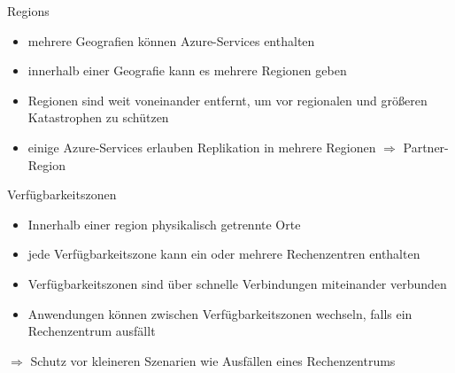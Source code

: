 

\begin{flashcard}[]{Regions}
  \begin{itemize}
    \item mehrere Geografien können Azure-Services enthalten
    \item innerhalb einer Geografie kann es mehrere Regionen geben
    \item Regionen sind weit voneinander entfernt, um vor regionalen und größeren Katastrophen zu schützen
    \item einige Azure-Services erlauben Replikation in mehrere Regionen\newline
      $\Rightarrow$ Partner-Region
  \end{itemize}
\end{flashcard}

\begin{flashcard}[]{Verfügbarkeitszonen}
  \begin{itemize}
    \item Innerhalb einer region physikalisch getrennte Orte
    \item jede Verfügbarkeitszone kann ein oder mehrere Rechenzentren enthalten
    \item Verfügbarkeitszonen sind über schnelle Verbindungen miteinander verbunden
    \item Anwendungen können zwischen Verfügbarkeitszonen wechseln, falls ein Rechenzentrum ausfällt
  \end{itemize}
  $\Rightarrow$ Schutz vor kleineren Szenarien wie Ausfällen eines Rechenzentrums
\end{flashcard}

